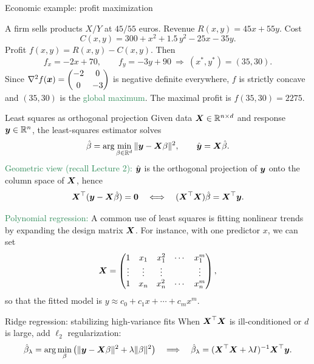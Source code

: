 \documentclass{beamer}
\begin{document}
\begin{frame}{Economic example: profit maximization}

A firm sells products \(X/Y\) at \(45/55\) euros. Revenue \(R(x,y)=45x+55y\). Cost
\[
C(x,y)=300+x^2+1.5\,y^2-25x-35y.
\]
Profit \(f(x,y)=R(x,y)-C(x,y)\). Then
\[
f_x=-2x+70,\qquad f_y=-3y+90 \ \Rightarrow\ (x^\ast,y^\ast)=(35,30).
\]
Since \(\nabla^2 f(\boldsymbol x)=\begin{pmatrix}-2&0\\[2pt]0&-3\end{pmatrix}\) is negative definite everywhere, \(f\) is strictly concave and \((35,30)\) is the \textcolor{SeaGreen}{global maximum}. The maximal profit is \(f(35,30)=2275\).

\end{frame}

\begin{frame}{Least squares as orthogonal projection}
Given data $\boldsymbol X\in\mathbb R^{n\times d}$ and response $\boldsymbol y\in\mathbb R^n$, the least-squares estimator solves
\[
\hat\beta=\arg\min_{\beta\in \mathbb R^d} \|\boldsymbol y-\boldsymbol X\beta\|^2,
\qquad
\hat {\boldsymbol y}=\boldsymbol X\hat\beta.
\]
\textcolor{SeaGreen}{Geometric view (recall Lecture 2):} $\hat {\boldsymbol y}$ is the orthogonal projection of $\boldsymbol y$ onto the column space of $\boldsymbol X$, hence
\[
\boldsymbol X^\top (\boldsymbol y-\boldsymbol X\hat\beta)=\boldsymbol 0
\quad\Longleftrightarrow\quad
(\boldsymbol X^\top \boldsymbol X)\hat\beta=\boldsymbol X^\top \boldsymbol y.
\]

\medskip
\textcolor{SeaGreen}{Polynomial regression:}  
A common use of least squares is fitting nonlinear trends by expanding the design matrix $\boldsymbol X$.  
For instance, with one predictor $x$, we can set
\[
\boldsymbol X=\begin{pmatrix}
1 & x_1 & x_1^2 & \cdots & x_1^m\\
\vdots & \vdots & \vdots & & \vdots \\
1 & x_n & x_n^2 & \cdots & x_n^m
\end{pmatrix},
\]
so that the fitted model is $y\approx c_0+c_1 x+\cdots+c_m x^m$.
\end{frame}
\begin{frame}{Ridge regression: stabilizing high-variance fits}
When $\boldsymbol X^\top \boldsymbol X$ is ill-conditioned or $d$ is large, add $\ell_2$ regularization:
\[
\hat\beta_\lambda=\arg\min_\beta \big(\|\boldsymbol y-\boldsymbol X\beta\|^2+\lambda\|\beta\|^2\big)
\quad\Longrightarrow\quad
\hat\beta_\lambda=(\boldsymbol X^\top \boldsymbol X+\lambda I)^{-1}\boldsymbol X^\top \boldsymbol y.
\]
\end{frame}
\end{document}
